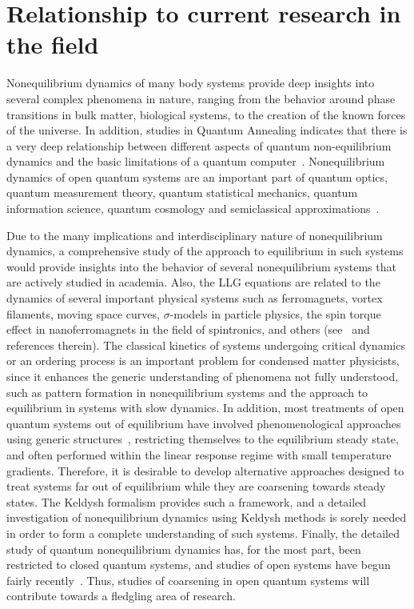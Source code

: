 \documentclass[a4paper,11pt,color]{article}
\begin{document}
\section{Relationship to current research in the field}
\label{sec:originality}
Nonequilibrium dynamics of many body systems provide deep insights into several complex phenomena in nature, ranging from the behavior around phase transitions in bulk matter, biological systems,  to the creation of the known forces of the universe. In addition, studies in Quantum Annealing indicates that there is a very deep relationship between different aspects of quantum non-equilibrium dynamics and the basic limitations of a quantum computer~\cite{annealing}. Nonequilibrium dynamics of open quantum systems are an important part of quantum optics, quantum measurement theory, quantum statistical mechanics, quantum information science, quantum cosmology and semiclassical approximations~\cite{openq}. 

Due to the many implications and interdisciplinary nature of nonequilibrium dynamics, a comprehensive study of the approach to equilibrium in such systems would provide insights into the behavior of several nonequilibrium systems that are actively studied in academia. Also, the LLG equations are related to the dynamics of several important physical systems such as ferromagnets, vortex filaments, moving space curves, $\sigma$-models in particle physics, the spin torque effect in 
nanoferromagnets in the field of spintronics, and others (see~\cite{gll:review} and references therein). The classical kinetics of systems undergoing critical dynamics or an ordering process is an important problem for condensed matter physicists, since it enhances the generic understanding of phenomena not fully understood, such as pattern formation in nonequilibrium systems and the approach to equilibrium in systems with slow dynamics. In addition, most treatments of open quantum systems out of equilibrium have involved phenomenological approaches using generic structures~\cite{openspin}, restricting  themselves to the equilibrium steady state, and often performed within the linear response regime with small temperature gradients. Therefore, it is desirable to develop alternative approaches designed to treat systems far out of equilibrium while they are coarsening towards steady states. The Keldysh formalism provides such a framework, and a detailed investigation of nonequilibrium dynamics using Keldysh 
methods is sorely needed in order to form a complete understanding of such systems. Finally, the detailed study of quantum nonequilibrium dynamics has, for the most part, been restricted to closed quantum systems, and studies of open systems have begun fairly recently~\cite{daley}. Thus, studies of coarsening in open quantum systems will contribute towards a fledgling area of research. 
\end{document}
